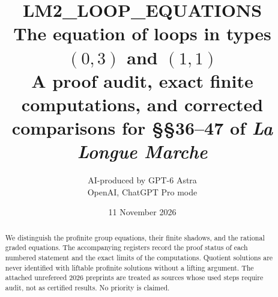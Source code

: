 \documentclass[11pt,a4paper]{article}
\title{\large\textsf{LM2\_LOOP\_EQUATIONS}\\[3pt]
The equation of loops in types $(0,3)$ and $(1,1)$\\
\normalsize A proof audit, exact finite computations, and corrected comparisons for \S\S36--47 of \emph{La Longue Marche}}
\author{AI-produced by GPT-6 Astra\\OpenAI, ChatGPT Pro mode}
\date{11 November 2026}
\begin{document}
\maketitle

\clearpage
\begin{abstract}
We distinguish the profinite group equations, their finite shadows, and the
rational graded equations. The accompanying registers record the proof status
of each numbered statement and the exact limits of the computations. Quotient
solutions are never identified with liftable profinite solutions without a
lifting argument. The attached unrefereed 2026 preprints are treated as sources
whose used steps require audit, not as certified results. No priority is claimed.
\end{abstract}

\tableofcontents
\clearpage












\end{document}
